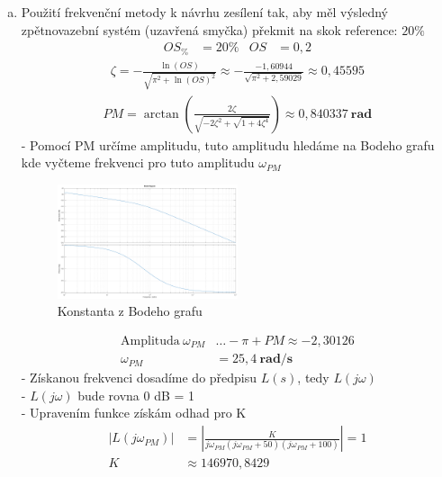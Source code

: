 \documentclass{article}
\begin{document}
\begin{enumerate}[a)]
    \item Použití frekvenční metody k návrhu zesílení tak, aby měl výsledný zpětnovazební systém (uzavřená smyčka) překmit na skok reference: $20\%$
    \begin{align*}
        OS_\% &= 20\% & OS &= 0,2
    \end{align*}
    \begin{align*}
        \zeta = -\frac{\ln{(OS)}}{\sqrt{\pi^2+\ln{(OS)}^2}} \approx - \frac{-1,60944}{\sqrt{\pi^2+2,59029}} \approx 0,45595
    \end{align*}
    \begin{align*}
        PM = \arctan{\left(\frac{2\zeta}{\sqrt{-2\zeta^2+\sqrt{1+4\zeta^4}}}\right)} \approx 0,840337 \ \mathbf{rad}
    \end{align*}
    - Pomocí PM určíme amplitudu, tuto amplitudu hledáme na Bodeho grafu kde vyčteme frekvenci pro tuto amplitudu $\omega_{PM}$

    \begin{figure}[hbt]
        \centering
        \includegraphics[clip, width=0.5\textwidth]{Bode_Plot.eps}
        \caption{Konstanta z Bodeho grafu}
        \label{fig:Const_Bode}
    \end{figure}
    
    \begin{align*}
        \text{Amplituda} \ \omega_{PM} &\dots - \pi + PM \approx -2,30126\\
        \omega_{PM} &= 25,4 \ \mathbf{rad/s}
    \end{align*}
    - Získanou frekvenci dosadíme do předpisu $L(s)$, tedy $L(j\omega)$\\
    - $L(j\omega)$ bude rovna 0 dB = 1\\
    - Upravením funkce získám odhad pro K
    \begin{align*}
        \left|L\left(j\omega_{PM}\right)\right| &= \left| \frac{K}{j\omega_{PM}\left( j\omega_{PM} + 50 \right) \left( j\omega_{PM} + 100 \right)} \right| = 1\\
        K &\approx 146970,8429
    \end{align*}


\end{enumerate}
\end{document}
